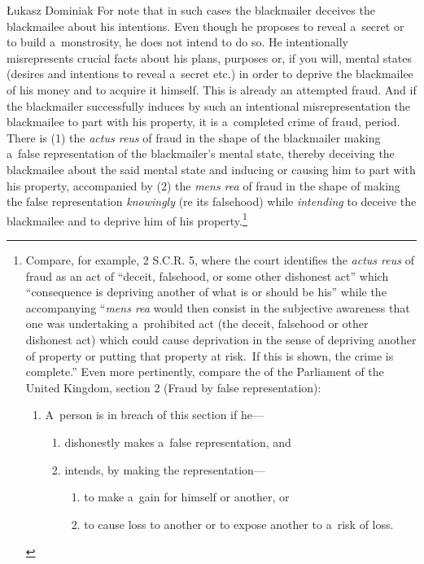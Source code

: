 \begin{artengenv}{Łukasz Dominiak}
For note that in such cases the blackmailer deceives the blackmailee about his intentions. Even though he proposes to reveal a~secret or to build a~monstrosity, he does not intend to do so. He intentionally misrepresents crucial facts about his plans, purposes or, if you will, mental states (desires and intentions to reveal a~secret etc.) in order to deprive the blackmailee of his money and to acquire it himself. This is already an attempted fraud. And if the blackmailer successfully induces by such an intentional misrepresentation the blackmailee to part with his property, it is a~completed crime of fraud, period. There is (1) the \textit{actus reus} of fraud in the shape of the blackmailer making a~false representation of the blackmailer's mental state, thereby deceiving the blackmailee about the said mental state and inducing or causing him to part with his property, accompanied by (2) the \textit{mens rea} of fraud in the shape of making the false representation \textit{knowingly} (re its falsehood) while \textit{intending} to deceive the blackmailee and to deprive him of his property.\footnote{Compare, for example, 
\parencite[][]{noauthor_regina_1993} %
 2 S.C.R. 5, where the court identifies the \textit{actus reus} of fraud as an act of ``deceit, falsehood, or some other dishonest act'' which ``consequence is depriving another of what is or should be his'' while the accompanying ``\textit{mens rea} would then consist in the subjective awareness that one was undertaking a~prohibited act (the deceit, falsehood or other dishonest act) which could cause deprivation in the sense of depriving another of property or putting that property at risk.~If this is shown, the crime is complete.'' Even more pertinently, compare the 
\parencite[][]{noauthor_fraud_nodate} %
 of the Parliament of the United Kingdom, section 2 (Fraud by false representation):
\begin{enumerate}
\item A~person is in breach of this section if he---
\begin{enumerate}
\item dishonestly makes a~false representation, and
\item intends, by making the representation---
\begin{enumerate}
\item to make a~gain for himself or another, or
\item to cause loss to another or to expose another to a~risk of loss.

\end{enumerate}
\end{enumerate}
\end{enumerate}}
\end{artengenv}
